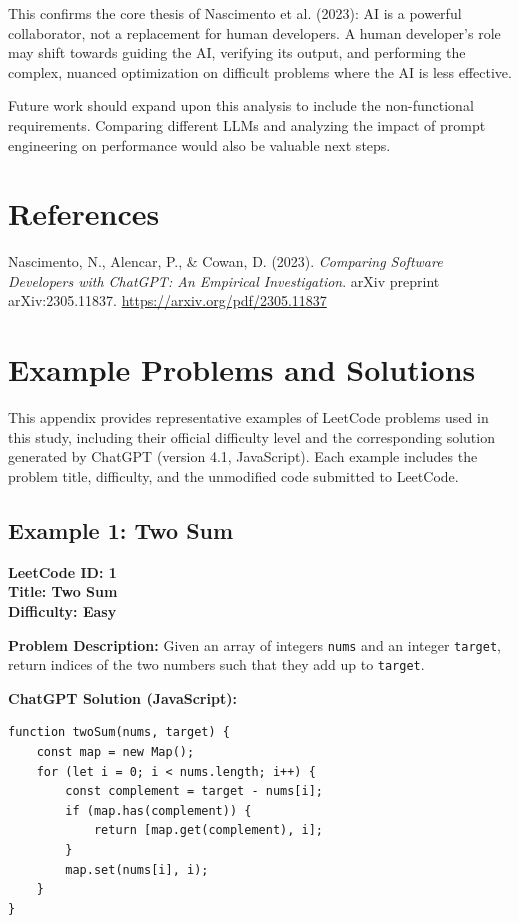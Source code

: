 \documentclass[12pt, a4paper]{article}
\begin{document}
This confirms the core thesis of Nascimento et al. (2023): AI is a powerful collaborator, not a replacement for human developers. A human developer's role may shift towards guiding the AI, verifying its output, and performing the complex, nuanced optimization on difficult problems where the AI is less effective.

Future work should expand upon this analysis to include the non-functional requirements. Comparing different LLMs and analyzing the impact of prompt engineering on performance would also be valuable next steps.

\section{References}

Nascimento, N., Alencar, P., \& Cowan, D. (2023). \textit{Comparing Software Developers with ChatGPT: An Empirical Investigation}. arXiv preprint arXiv:2305.11837. \url{https://arxiv.org/pdf/2305.11837}

\appendix
\section{Example Problems and Solutions}
\label{sec:example_problems}

This appendix provides representative examples of LeetCode problems used in this study, including their official difficulty level and the corresponding solution generated by ChatGPT (version 4.1, JavaScript). Each example includes the problem title, difficulty, and the unmodified code submitted to LeetCode.

\subsection{Example 1: Two Sum}
\textbf{LeetCode ID: 1} \\
\textbf{Title: Two Sum} \\
\textbf{Difficulty: Easy}

\textbf{Problem Description:}
Given an array of integers \texttt{nums} and an integer \texttt{target}, return indices of the two numbers such that they add up to \texttt{target}.

\textbf{ChatGPT Solution (JavaScript):}

\begin{verbatim}
function twoSum(nums, target) {
    const map = new Map();
    for (let i = 0; i < nums.length; i++) {
        const complement = target - nums[i];
        if (map.has(complement)) {
            return [map.get(complement), i];
        }
        map.set(nums[i], i);
    }
}
\end{verbatim}
\end{document}
